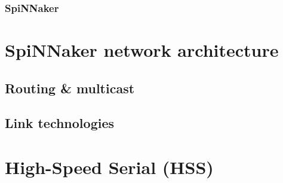 			
			\subsubsection{SpiNNaker}
				
	
	
	\section{SpiNNaker network architecture}
		\label{sec:spinnaker}
		
		
		\subsection{Routing \& multicast}
			
		
		\subsection{Link technologies}
			
	
	\section{High-Speed Serial (HSS)}
		\label{sec:high-speed-serial}
		
		
